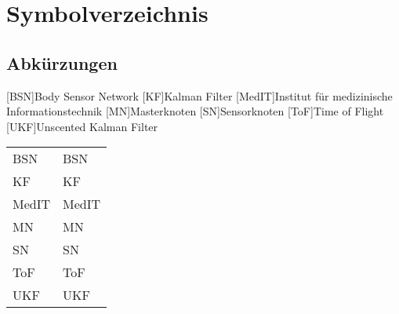 \chapter*{Symbolverzeichnis}										%



\section*{Abkürzungen}


[BSN]{Body Sensor Network}
[KF]{Kalman Filter}
[MedIT]{Institut f{\"u}r medizinische Informationstechnik}
[MN]{Masterknoten}
[SN]{Sensorknoten}
[ToF]{Time of Flight}
[UKF]{Unscented Kalman Filter}



\begin{tabularx}{\textwidth}{p{}X}
\acs{BSN} & \acl{BSN} \\
\acs{KF} & \acl{KF} \\
\acs{MedIT} & \acl{MedIT} \\
\acs{MN} & \acl{MN} \\
\acs{SN} & \acl{SN} \\
\acs{ToF} & \acl{ToF} \\
\acs{UKF} & \acl{UKF} \\
\end{tabularx}
